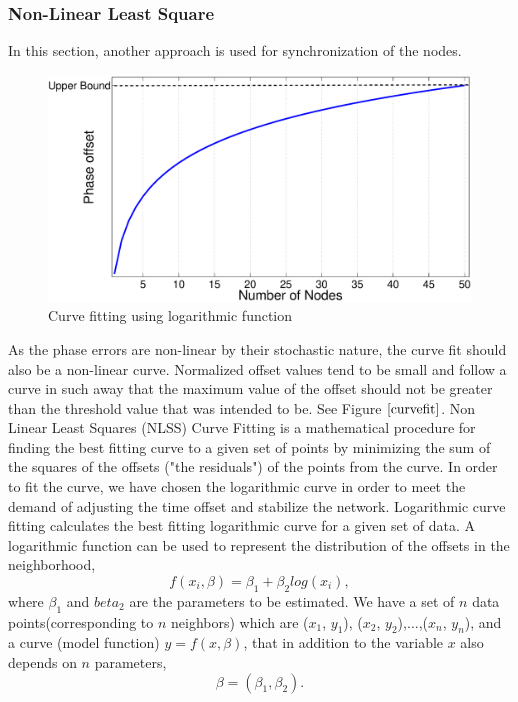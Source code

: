 \documentclass[a4paper,10pt]{report}
\begin{document}
\subsubsection{Non-Linear Least Square}
In this section, another approach is used for synchronization of the nodes.
\newline
\begin{figure}
\centering
\includegraphics[width=0.75 \textwidth]{curvefit}
\caption{Curve fitting using logarithmic function} \label{curvefit}
\end{figure}
As the phase errors are non-linear by their stochastic nature, the curve fit should also be a non-linear curve. Normalized offset values tend to be small and follow a curve in such away that the maximum value of the offset should not be greater than the threshold value that was intended to be. See Figure $\ref{curvefit}$. 
\newline Non Linear Least Squares (NLSS) Curve Fitting  is a mathematical procedure for finding the best fitting curve to a given set of points by minimizing the sum of the squares of the offsets ("the residuals") of the points from the curve. In order to fit the curve, we have chosen the logarithmic curve in order to meet the demand of adjusting the time offset and stabilize the network. Logarithmic
curve fitting calculates the best fitting logarithmic curve for a given set of data. A logarithmic function can be used to represent
the distribution of the offsets in the neighborhood, 
\begin{equation}
 f(x_i,\beta)= \beta _1 + \beta_2log(x_i),
\end{equation}
where $\beta_1$ and $beta_2$ are the parameters to be estimated.\newline
We have a set of $n$ data points(corresponding to $n$ neighbors) which are ($x_1$, $y_1$), ($x_2$, $y_2$),$\dots$,($x_n$, $y_n$), and a curve (model function) $y= f(x, \beta)$, that in addition to the variable $x$ also depends on $n$ parameters,
\begin{equation}
\beta = (\beta_1, \beta_2).
\end{equation}
\end{document}
